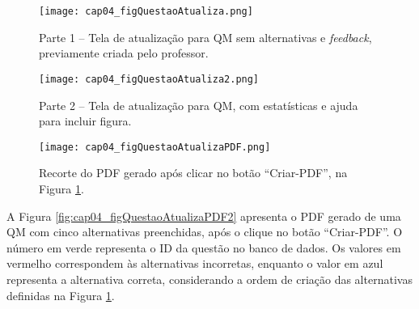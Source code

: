 

\begin{figure}[!ht]
  \centering
  \texttt{[image: cap04\_figQuestaoAtualiza.png]}
  \caption{Parte 1 -- Tela de atualização para QM sem alternativas e \textit{feedback}, previamente criada pelo professor.}
  \label{fig:cap04_figQuestaoAtualiza}
\end{figure}

\begin{figure}[!ht]
  \centering
  \texttt{[image: cap04\_figQuestaoAtualiza2.png]}
  \caption{Parte 2 -- Tela de atualização para QM, com estatísticas e ajuda para incluir figura.}
  \label{fig:cap04_figQuestaoAtualiza2}
\end{figure}

\begin{figure}[!ht]
  \texttt{[image: cap04\_figQuestaoAtualizaPDF.png]}
  \caption{Recorte do PDF gerado após clicar no botão ``Criar-PDF'', na Figura \ref{fig:cap04_figQuestaoAtualiza}.}
  \label{fig:cap04_figQuestaoAtualizaPDF}
\end{figure}

A Figura \ref{fig:cap04_figQuestaoAtualizaPDF2} apresenta o PDF gerado de uma QM com cinco alternativas preenchidas, após o clique no botão ``Criar-PDF''. O número em verde representa o ID da questão no banco de dados. Os valores em vermelho correspondem às alternativas incorretas, enquanto o valor em azul representa a alternativa correta, considerando a ordem de criação das alternativas definidas na Figura \ref{fig:cap04_figQuestaoAtualiza}.


